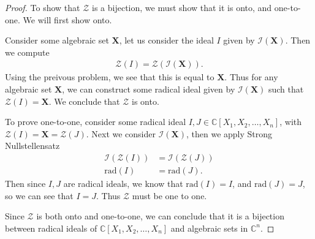 \documentclass[10pt]{amsart}
\newcommand{\C}{\mathbb{C}}
\newcommand{\rad}[1]{\text{rad}\left(#1\right)}
\newenvironment{claim}[1]{\par\noindent\textit{Claim:}\space#1}{}
\begin{document}
\begin{proof}
  To show that $\mathscr{Z}$ is a bijection, we must show that it is onto, and
  one-to-one. We will first show onto.

  Consider some algebraic set $\mathbf{X}$, let us consider the ideal $I$ given
  by $\mathscr{I}(\mathbf{X})$. Then we compute
  \begin{align*}
    \mathscr{Z}(I)=\mathscr{Z}(\mathscr{I}(\mathbf{X})).
  \end{align*}
  Using the preivous problem, we see that this is equal to $\mathbf{X}$. Thus
  for any algebraic set $\mathbf{X}$, we can construct some radical ideal given
  by $\mathscr{I}(\mathbf{X})$ such that $\mathscr{Z}(I)=\mathbf{X}$. We
  conclude that $\mathscr{Z}$ is onto.

  To prove one-to-one, consider some radical ideal
  $I,J\in\C[X_1,X_2,\ldots,X_n]$, with $\mathscr{Z}(I)=\mathbf{X} =
  \mathscr{Z}(J)$. Next we consider $\mathscr{I}(\mathbf{X})$, then we apply
  Strong Nullstellensatz
  \begin{align*}
    \mathscr{I}(\mathscr{Z}(I))&=\mathscr{I}(\mathscr{Z}(J))\\
    \rad{I}&=\rad{J}.
  \end{align*}
  Then since $I,J$ are radical ideals, we know that $\rad{I}=I$, and
  $\rad{J}=J$, so we can see that $I=J$. Thus $\mathscr{Z}$ must be one to one.

  Since $\mathscr{Z}$ is both onto and one-to-one, we can conclude that it is a
  bijection between radical ideals of $\C[X_1,X_2,\ldots,X_n]$ and algebraic
  sets in $\C^n$.
\end{proof}
\end{document}
